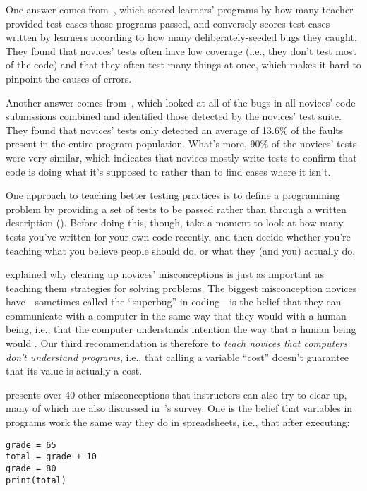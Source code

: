 One answer comes from~\cite{Bria2015}, which scored learners'
programs by how many teacher-provided test cases those programs passed,
and conversely scores test cases written by learners according to how
many deliberately-seeded bugs they caught. They found that novices'
tests often have low coverage (i.e., they don't test most of the code)
and that they often test many things at once, which makes it hard to
pinpoint the causes of errors.

Another answer comes from~\cite{Edwa2014b}, which looked at all of
the bugs in all novices' code submissions combined and identified those
detected by the novices' test suite. They found that novices' tests only
detected an average of 13.6\% of the faults present in the entire program
population. What's more, 90\% of the novices' tests were very similar,
which indicates that novices mostly write tests to confirm that code is
doing what it's supposed to rather than to find cases where it isn't.

One approach to teaching better testing practices is to define a
programming problem by providing a set of tests to be passed rather than
through a written description ().
Before doing this, though, take a moment to look at how many tests
you've written for your own code recently, and then decide whether
you're teaching what you believe people should do, or what they (and
you) actually do.


 explained why clearing up novices' misconceptions
is just as important as teaching them strategies for solving problems.
The biggest misconception novices have---sometimes called the ``superbug''
in coding---is the belief that they can communicate with a computer in the
same way that they would with a human being, i.e., that the computer
understands intention the way that a human being would
\cite{Pea1986}. Our third recommendation is therefore to \emph{teach
novices that computers don't understand programs}, i.e., that calling a
variable ``cost'' doesn't guarantee that its value is actually a cost.

\cite{Sorv2018} presents over 40 other misconceptions that
instructors can also try to clear up, many of which are also discussed
in~\cite{Qian2017}'s survey. One is the belief that variables in
programs work the same way they do in spreadsheets, i.e., that after
executing:

\begin{verbatim}
grade = 65
total = grade + 10
grade = 80
print(total)
\end{verbatim}

